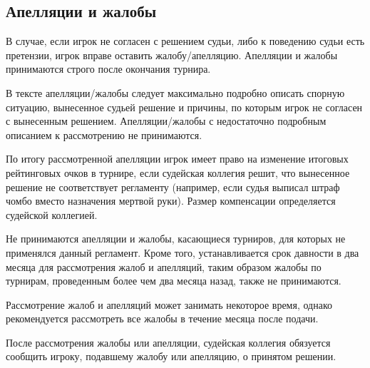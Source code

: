 \subsection{Апелляции и жалобы}

В случае, если игрок не согласен с решением судьи, либо к поведению судьи есть претензии, игрок вправе оставить жалобу/апелляцию. Апелляции и жалобы принимаются строго после окончания турнира.

В тексте апелляции/жалобы следует максимально подробно описать спорную ситуацию, вынесенное судьей решение и причины, по которым игрок не согласен с вынесенным решением. Апелляции/жалобы с недостаточно подробным описанием к рассмотрению не принимаются.

По итогу рассмотренной апелляции игрок имеет право на изменение итоговых рейтинговых очков в турнире, если судейская коллегия решит, что вынесенное решение не соответствует регламенту (например, если судья выписал штраф чомбо вместо назначения мертвой руки). Размер компенсации определяется судейской коллегией. 

Не принимаются апелляции и жалобы, касающиеся турниров, для которых не применялся данный регламент. Кроме того, устанавливается срок давности в два месяца для рассмотрения жалоб и апелляций, таким образом жалобы по турнирам, проведенным более чем два месяца назад, также не принимаются.

Рассмотрение жалоб и апелляций может занимать некоторое время, однако рекомендуется рассмотреть все жалобы в течение месяца после подачи. 

После рассмотрения жалобы или апелляции, судейская коллегия обязуется сообщить игроку, подавшему жалобу или апелляцию, о принятом решении.